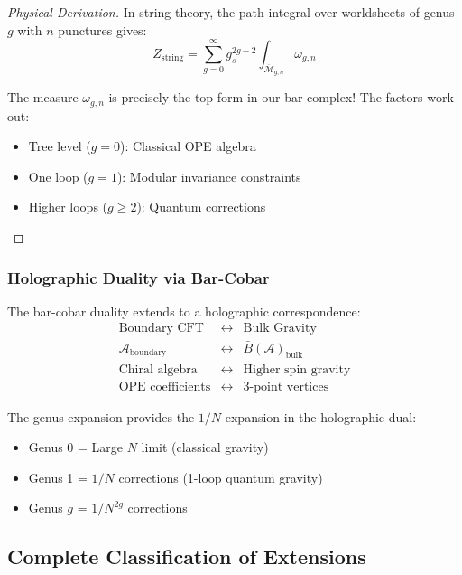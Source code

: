 \begin{proof}[Physical Derivation]
In string theory, the path integral over worldsheets of genus $g$ with $n$ punctures gives:
\[
Z_{\text{string}} = \sum_{g=0}^\infty g_s^{2g-2} \int_{\overline{\mathcal{M}}_{g,n}} \omega_{g,n}
\]

The measure $\omega_{g,n}$ is precisely the top form in our bar complex! The factors work out:
\begin{itemize}
\item Tree level ($g=0$): Classical OPE algebra
\item One loop ($g=1$): Modular invariance constraints
\item Higher loops ($g \geq 2$): Quantum corrections
\end{itemize}
\end{proof}

\subsubsection{Holographic Duality via Bar-Cobar}

\begin{theorem}
The bar-cobar duality extends to a holographic correspondence:
\[
\begin{array}{ccc}
\text{Boundary CFT} & \leftrightarrow & \text{Bulk Gravity} \\
\mathcal{A}_{\text{boundary}} & \leftrightarrow & \bar{B}(\mathcal{A})_{\text{bulk}} \\
\text{Chiral algebra} & \leftrightarrow & \text{Higher spin gravity} \\
\text{OPE coefficients} & \leftrightarrow & \text{3-point vertices}
\end{array}
\]
\end{theorem}

The genus expansion provides the $1/N$ expansion in the holographic dual:
\begin{itemize}
\item Genus 0 = Large $N$ limit (classical gravity)
\item Genus 1 = $1/N$ corrections (1-loop quantum gravity)
\item Genus $g$ = $1/N^{2g}$ corrections
\end{itemize}

\subsection{Complete Classification of Extensions}


